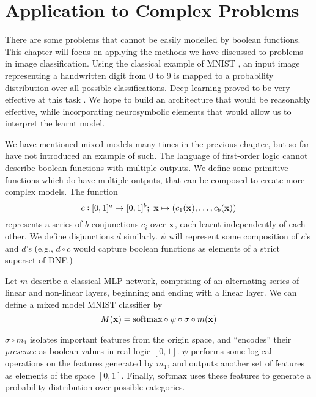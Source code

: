 \chapter{Application to Complex Problems}

There are some problems that cannot be easily modelled by boolean functions. This chapter will focus on applying the methods we have discussed to problems in image classification. Using the classical example of MNIST \cite{mnist}, an input image representing a handwritten digit from 0 to 9 is mapped to a probability distribution over all possible classifications. Deep learning proved to be very effective at this task \cite{mnist}. We hope to build an architecture that would be reasonably effective, while incorporating neurosymbolic elements that would allow us to interpret the learnt model.

We have mentioned mixed models many times in the previous chapter, but so far have not introduced an example of such. The language of first-order logic cannot describe boolean functions with multiple outputs. We define some primitive functions which do have multiple outputs, that can be composed to create more complex models. The function
$$
c : [0,1]^a \to [0,1]^b ;\ \mathbf{x} \mapsto (c_1(\mathbf{x}), \dots, c_b(\mathbf{x}))
$$
represents a series of $b$ conjunctions $c_i$ over $\mathbf{x}$, each learnt independently of each other. We define disjunctions $d$ similarly. $\psi$ will represent some composition of $c$'s and $d$'s (e.g., $d \circ c$ would capture boolean functions as elements of a strict superset of DNF.)

Let $m$ describe a classical MLP network, comprising of an alternating series of linear and non-linear layers, beginning and ending with a linear layer. We can define a mixed model MNIST classifier by
$$
M(\mathbf{x}) = \text{softmax} \circ \psi \circ \sigma \circ m (\mathbf{x}) 
$$

$\sigma \circ m_1$ isolates important features from the origin space, and ``encodes'' their \textit{presence} as boolean values in real logic $[0,1]$. $\psi$ performs some logical operations on the features generated by $m_1$, and outputs another set of features as elements of the space $[0,1]$. Finally, $\text{softmax}$ uses these features to generate a probability distribution over possible categories.



